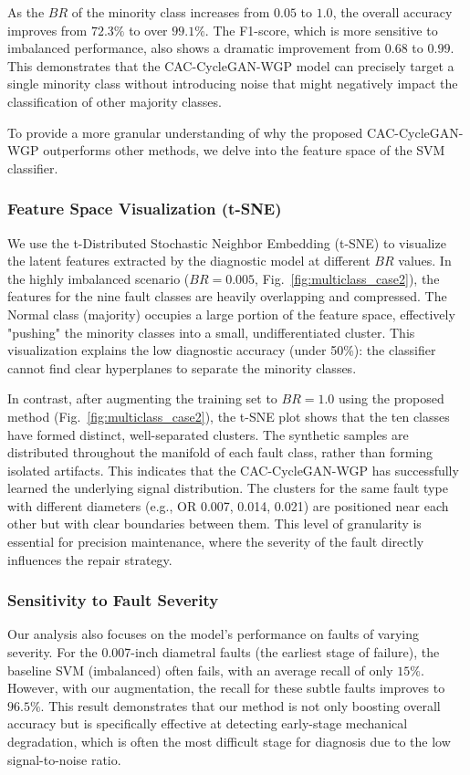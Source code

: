 As the $BR$ of the minority class increases from $0.05$ to $1.0$, the overall accuracy improves from $72.3\%$ to over $99.1\%$. The F1-score, which is more sensitive to imbalanced performance, also shows a dramatic improvement from $0.68$ to $0.99$. This demonstrates that the CAC-CycleGAN-WGP model can precisely target a single minority class without introducing noise that might negatively impact the classification of other majority classes.

To provide a more granular understanding of why the proposed CAC-CycleGAN-WGP outperforms other methods, we delve into the feature space of the SVM classifier.

\subsubsection{Feature Space Visualization (t-SNE)}
We use the t-Distributed Stochastic Neighbor Embedding (t-SNE) to visualize the latent features extracted by the diagnostic model at different $BR$ values. In the highly imbalanced scenario ($BR=0.005$, Fig.~\ref{fig:multiclass_case2}), the features for the nine fault classes are heavily overlapping and compressed. The Normal class (majority) occupies a large portion of the feature space, effectively "pushing" the minority classes into a small, undifferentiated cluster. This visualization explains the low diagnostic accuracy (under 50\%): the classifier cannot find clear hyperplanes to separate the minority classes.

In contrast, after augmenting the training set to $BR=1.0$ using the proposed method (Fig.~\ref{fig:multiclass_case2}), the t-SNE plot shows that the ten classes have formed distinct, well-separated clusters. The synthetic samples are distributed throughout the manifold of each fault class, rather than forming isolated artifacts. This indicates that the CAC-CycleGAN-WGP has successfully learned the underlying signal distribution. The clusters for the same fault type with different diameters (e.g., OR 0.007, 0.014, 0.021) are positioned near each other but with clear boundaries between them. This level of granularity is essential for precision maintenance, where the severity of the fault directly influences the repair strategy.

\subsubsection{Sensitivity to Fault Severity}
Our analysis also focuses on the model's performance on faults of varying severity. For the 0.007-inch diametral faults (the earliest stage of failure), the baseline SVM (imbalanced) often fails, with an average recall of only $15\%$. However, with our augmentation, the recall for these subtle faults improves to $96.5\%$. This result demonstrates that our method is not only boosting overall accuracy but is specifically effective at detecting early-stage mechanical degradation, which is often the most difficult stage for diagnosis due to the low signal-to-noise ratio.

